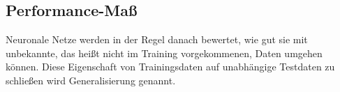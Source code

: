 







\subsection{Performance-Maß}

Neuronale Netze werden in der Regel danach bewertet, wie gut sie mit unbekannte, das heißt nicht im Training vorgekommenen, Daten umgehen können.
Diese Eigenschaft von Trainingsdaten auf unabhängige Testdaten zu schließen wird Generalisierung genannt. 

